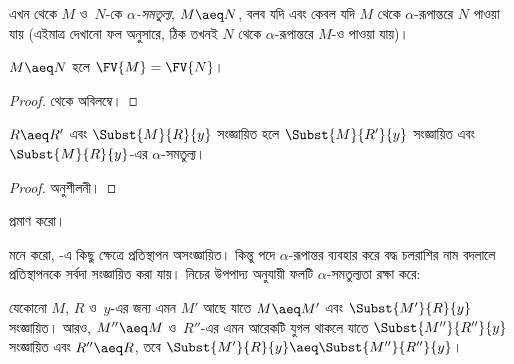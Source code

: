 \documentclass[../../../include/open-logic-section]{subfiles}
\begin{document}
এখন থেকে $M$ ও~$N$-কে \emph{$\alpha$-সমতুল্য}, $M \aeq N$, বলব যদি
এবং কেবল যদি $M$ থেকে $\alpha$-রূপান্তরে $N$ পাওয়া যায় (এইমাত্র
দেখানো ফল অনুসারে, ঠিক তখনই $N$ থেকে $\alpha$-রূপান্তরে $M$-ও পাওয়া যায়)।

\begin{thm}
  $M \aeq N$ হলে $\FV{M} = \FV{N}$।
\end{thm}

\begin{proof}
   থেকে অবিলম্বে।
\end{proof}

\begin{lem}
  $R \aeq R'$ এবং $\Subst{M}{R}{y}$ সংজ্ঞায়িত হলে
  $\Subst{M}{R'}{y}$ সংজ্ঞায়িত এবং $\Subst{M}{R}{y}$-এর
  $\alpha$-সমতুল্য।
\end{lem}

\begin{proof}
  অনুশীলনী।
\end{proof}

\begin{prob}
   প্রমাণ করো।
\end{prob}

মনে করো, -এ কিছু ক্ষেত্রে প্রতিস্থাপন অসংজ্ঞায়িত। কিন্তু
পদে $\alpha$-রূপান্তর ব্যবহার করে বদ্ধ চলরাশির নাম বদলালে প্রতিস্থাপনকে
সর্বদা সংজ্ঞায়িত করা যায়। নিচের উপপাদ্য অনুযায়ী ফলটি
$\alpha$-সমতুল্যতা রক্ষা করে:

\begin{thm}
  যেকোনো $M$, $R$ ও~$y$-এর জন্য এমন $M'$ আছে যাতে $M \aeq M'$ এবং
  $\Subst{M'}{R}{y}$ সংজ্ঞায়িত। আরও, $M'' \aeq M$ ও~$R''$-এর এমন
  আরেকটি যুগল থাকলে যাতে $\Subst{M''}{R''}{y}$ সংজ্ঞায়িত এবং
  $R'' \aeq R$, তবে
  $\Subst{M'}{R}{y} \aeq \Subst{M''}{R''}{y}$।
\end{thm}
\end{document}
